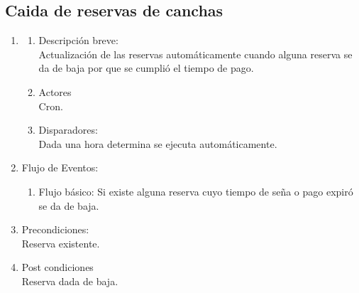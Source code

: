 \documentclass[a4paper,11pt]{article}
\begin{document}
\subsection{Caida de reservas de canchas}
\begin{enumerate}

        \item
	\begin{enumerate}
            \item Descripción breve: \\
                Actualización de las reservas automáticamente cuando alguna reserva
                se da de baja por que se cumplió el tiempo de pago.
            \item Actores \\
                Cron.
            \item Disparadores: \\
                Dada una hora determina se ejecuta automáticamente.
        \end{enumerate}

        \item Flujo de Eventos: 

        \begin{enumerate}
            \item Flujo básico:
                Si existe alguna reserva cuyo tiempo de seña o pago expiró se da de baja.
        \end{enumerate}

        \item Precondiciones: \\
            Reserva existente.

        \item Post condiciones \\
            Reserva dada de baja.

\end{enumerate}


\end{document}
